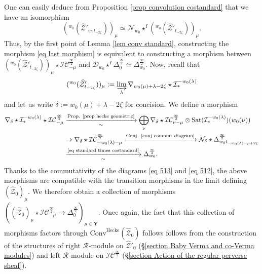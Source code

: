 \documentclass[11pt]{amsart}
\theoremstyle{plain}
\theoremstyle{remark}
\numberwithin{equation}{section}
\begin{document}
One can easily deduce from Proposition \ref{prop convolution costandard} that we have an isomorphism 
$$({^{w_0}(\widehat{\mathcal{Z}}'_{w_0t_{-2\zeta}})})_\mu\simeq \mathcal{N}_{w_0}\star^I({^{w_0}(\widehat{\mathcal{Z}}'_{t_{-2\zeta}})})_\mu.$$
Thus, by the first point of Lemma \ref{lem conv standard}, constructing the morphism \eqref{eq last morphism} is equivalent to constructing a morphism between $({^{w_0}(\widehat{\mathcal{Z}}'_{t_{-2\zeta}})})_\mu\star\mathcal{IC}^{\frac{\infty}{2}}_{-\mu}$ and $\mathcal{D}_{w_0}\star^I\Delta^{\frac{\infty}{2}}_0\simeq \Delta^{\frac{\infty}{2}}_{w_0}$. Now, recall that 
$$({^{w_0}(\widehat{\mathcal{Z}}'_{t_{-2\zeta}})})_\mu:=  \varinjlim_{\lambda} \nabla_{w_0(\mu)+\lambda-2\zeta}\star \mathcal{I}^{-w_0(\lambda)}_*$$
and let us write $\delta:=w_0(\mu)+\lambda-2\zeta$ for concision. We define a morphism
\begin{align*}
   \nabla_{\delta}\star \mathcal{I}^{-w_0(\lambda)}_*\star\mathcal{IC}^{\frac{\infty}{2}}_{-\mu}&\xrightarrow[\sim]{\text{Prop. \ref{prop hecke geometric}}}\bigoplus_{\nu}\nabla_{\delta}\star\mathcal{IC}^{\frac{\infty}{2}}_{\nu-\mu}\otimes\mathrm{Sat}(\mathcal{I}^{-w_0(\lambda)}_*)(w_0(\nu)) \\
    &\to \nabla_{\delta}\star\mathcal{IC}^{\frac{\infty}{2}}_{-w_0(\lambda)-\mu}\xrightarrow{\text{Conj. \ref{conj commut diagram}}} \mathcal{N}_{\delta}\star\Delta^{\frac{\infty}{2}}_{w_0t_{-w_0(\lambda)-\mu+2\zeta}}\\
    &\xrightarrow[\sim]{\text{\eqref{eq standard times costandard}}}\Delta^{\frac{\infty}{2}}_{w_0}.
\end{align*}
Thanks to the commutativity of the diagrams \eqref{eq 513} and \eqref{eq 512}, the above morphisms are compatible with the transition morphisms in the limit defining $(\widehat{\mathcal{Z}}_0)_\mu$. We therefore obtain a collection of morphisms $((\widehat{\mathcal{Z}}_0)_\mu\star\mathcal{IC}^{\frac{\infty}{2}}_{-\mu}\to \Delta^{\frac{\infty}{2}}_{0})_{\mu\in\mathbf{Y}}$. Once again, the fact that this collection of morphisms factors through $\mathrm{Conv}^{\mathrm{Hecke}}(\widehat{\mathcal{Z}}_0)$ follows follows from the construction of the structures of right $\mathcal{R}$-module on $\widehat{\mathcal{Z}}'_0$ (§\ref{section Baby Verma and co-Verma modules}) and left $\mathcal{R}$-module on $\mathcal{IC}^{\frac{\infty}{2}}$ (§\ref{section Action of the regular perverse sheaf}).
\end{document}
